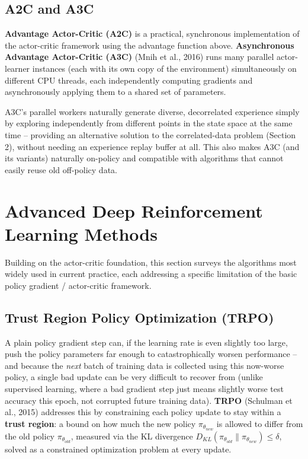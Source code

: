 \documentclass[12pt,a4paper]{article}
\begin{document}
\subsection{A2C and A3C}

\textbf{Advantage Actor-Critic (A2C)} is a practical, synchronous implementation of the actor-critic framework using the advantage function above. \textbf{Asynchronous Advantage Actor-Critic (A3C)} (Mnih et al., 2016) runs many parallel actor-learner instances (each with its own copy of the environment) simultaneously on different CPU threads, each independently computing gradients and asynchronously applying them to a shared set of parameters.

\begin{keyidea}
A3C's parallel workers naturally generate diverse, decorrelated experience simply by exploring independently from different points in the state space at the same time -- providing an alternative solution to the correlated-data problem (Section 2), without needing an experience replay buffer at all. This also makes A3C (and its variants) naturally on-policy and compatible with algorithms that cannot easily reuse old off-policy data.
\end{keyidea}

\newpage

\section{Advanced Deep Reinforcement Learning Methods}

Building on the actor-critic foundation, this section surveys the algorithms most widely used in current practice, each addressing a specific limitation of the basic policy gradient / actor-critic framework.

\subsection{Trust Region Policy Optimization (TRPO)}

\begin{keyidea}
A plain policy gradient step can, if the learning rate is even slightly too large, push the policy parameters far enough to catastrophically worsen performance -- and because the \emph{next} batch of training data is collected using this now-worse policy, a single bad update can be very difficult to recover from (unlike supervised learning, where a bad gradient step just means slightly worse test accuracy this epoch, not corrupted future training data). \textbf{TRPO} (Schulman et al., 2015) addresses this by constraining each policy update to stay within a \textbf{trust region}: a bound on how much the new policy $\pi_{\theta_{new}}$ is allowed to differ from the old policy $\pi_{\theta_{old}}$, measured via the KL divergence $D_{KL}(\pi_{\theta_{old}} \| \pi_{\theta_{new}}) \leq \delta$, solved as a constrained optimization problem at every update.
\end{keyidea}
\end{document}
